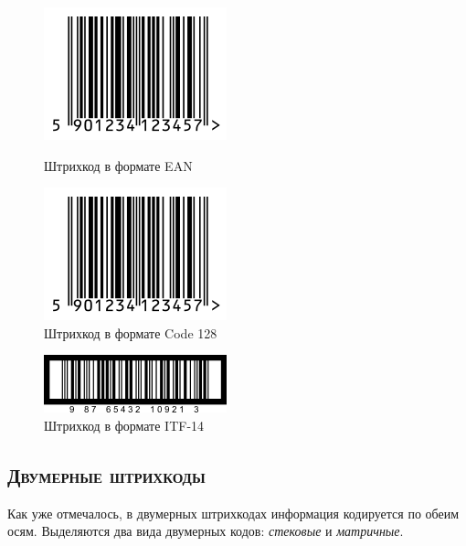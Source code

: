\begin{figure}[h]
    \begin{multicols}{2}
 
        \begin{center}
             \includegraphics[scale=0.5]{img/ean_sample} 
             \caption{Штрихкод в формате EAN}
             \label{fig:ean}
        \end{center}
   
        \begin{center}
            \includegraphics[scale=0.5]{img/ean_sample} 
            \caption{Штрихкод в формате Code 128}
            \label{fig:code128}
        \end{center}       
       
    \end{multicols}
\end{figure}

\begin{figure}[h]
    \centering
    \includegraphics[scale=0.7]{img/itf_sample}
    \caption{Штрихкод в формате ITF-14}
    \label{fig:itf14}
\end{figure}
    
\subsection{\textsc{Двумерные штрихкоды}}

Как уже отмечалось, в двумерных штрихкодах информация кодируется
по обеим осям. Выделяются два вида двумерных кодов: \textit{стековые}
и \textit{матричные}.

